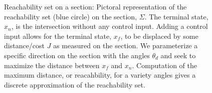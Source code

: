 \documentclass[smallcondensed]{svjour3}
\begin{document}
\begin{figure}
\begin{scaletikzpicturetowidth}{0.5\textwidth}
        \end{scaletikzpicturetowidth}
        \caption{Reachability set on a \Poincare section: Pictoral representation of the reachability set (blue circle) on the \Poincare section, \(\Sigma\). 
            The terminal state, \( x_n\), is the intersection without any control input. 
            Adding a control input allows for the terminal state, \( x_f \), to be displaced by some distance/cost \( J \) as measured on the section.
            We parameterize a specific direction on the section with the angles \( \theta_d\) and seek to maximize the distance between \( x_f \) and \( x_n \).
            Computation of the maximum distance, or reacahbility, for a variety angles gives a discrete approximation of the reachability set.\label{fig:reachability_set}}
\end{figure}
\end{document}
